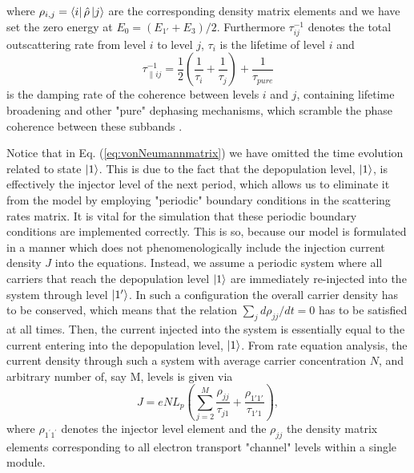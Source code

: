 \documentclass[twocolumn,secnumarabic,amssymb, nobibnotes, aps, prd]{revtex4-1}
\begin{document}
where $\rho_{i,j} = \Bra{i} \hat{\rho} \Ket{j}$ are the corresponding density matrix elements and we have set the zero energy at $E_0 = (E_{1'}+E_{3})/2 $. Furthermore $\tau_{ij}^{-1}$ denotes the total outscattering rate from level $i$ to level $j$, $\tau_{i}$ is the lifetime of level $i$ and
$$
\tau_{\parallel ij}^{-1} = \frac{1}{2}(\frac{1}{\tau_{i}} +\frac{1}{\tau_{j}}) + \frac{1}{\tau_{pure}}   
$$
is the damping rate of the coherence between levels $i$ and $j$, containing lifetime broadening and other "pure" dephasing mechanisms, which scramble the phase coherence between these subbands \cite{callebaut2005importance}. 

Notice that in Eq. (\ref{eq:vonNeumannmatrix}) we have omitted the time evolution related to state $\Ket{1}$. This is due to the fact that the depopulation level, $\Ket{1}$, is effectively the injector level of the next period, which allows us to eliminate it from the model by employing "periodic" boundary conditions in the scattering rates matrix. It is vital for the simulation that these periodic boundary conditions are implemented correctly. This is so, because our model is formulated in a manner which does not phenomenologically include the injection current density $J$ into the equations. Instead, we assume a periodic system where all carriers that reach the depopulation level $\Ket{1}$ are immediately re-injected into the system through level $\Ket{1'}$. In such a configuration the overall carrier density has to be conserved, which means that the relation $\sum_{j} d \rho_{jj}/dt =0 $ has to be satisfied at all times. Then, the current injected into the system is essentially equal to the current entering into the depopulation level, $\Ket{1}$. From rate equation analysis, the current density through such a system with average carrier concentration $N$, and arbitrary number of, say M,  levels is given via 
\begin{equation}
J = e N  L_p \left( \sum_{j=2}^{M}\frac{\rho_{jj}}{\tau_{j1}} + \frac{\rho_{1'1'}}{\tau_{1'1}} \right),
\end{equation}
where $\rho_{1^\prime 1^\prime}$ denotes the injector level element and the $\rho_{jj}$ the density matrix elements corresponding to all electron transport "channel" levels within a single module.   
\end{document}
